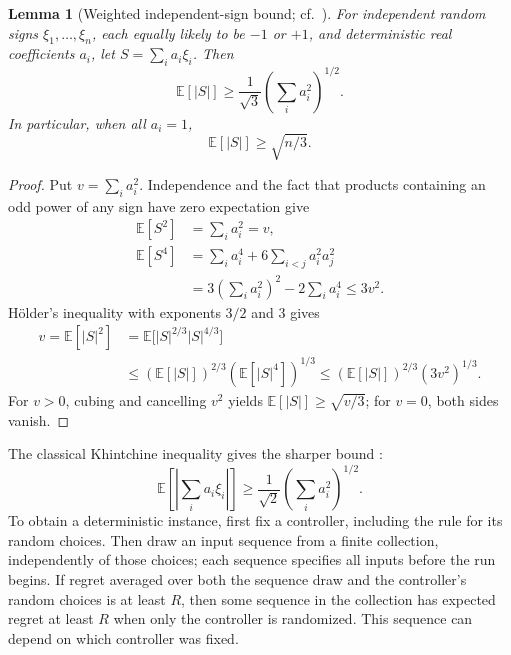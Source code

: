 \documentclass[11pt]{article}
\newcommand{\E}{\mathbb{E}}
\theoremstyle{plain}
\newtheorem{Thm:Lemma}[Thm:Theorem]{Lemma}
\theoremstyle{remark}
\numberwithin{equation}{section}
\begin{document}
\begin{Thm:Lemma}[Weighted independent-sign bound; cf.~{\cite{haagerup1981khintchine}}]
\label{lem:intro:signs}\label{ch6:lem:signs}
For independent random signs $\xi_1,\ldots,\xi_n$, each equally likely to be
$-1$ or $+1$, and deterministic real coefficients $a_i$, let
$S=\sum_i a_i\xi_i$. Then
\begin{equation}\label{eq:intro:sign-moment}
 \E[|S|]\ge\frac1{\sqrt3}\left(\sum_i a_i^2\right)^{1/2}.
\end{equation}
In particular, when all $a_i=1$,
\begin{equation}\label{ch6:eq:signs}
 \E[|S|]\ge\sqrt{n/3}.
\end{equation}
\end{Thm:Lemma}
\begin{proof}
Put $v=\sum_i a_i^2$.  Independence and the fact that products containing an
odd power of any sign have zero expectation give
\begin{align*}
 \E[S^2]&=\sum_i a_i^2=v,\\
 \E[S^4]
 &=\sum_i a_i^4+6\sum_{i<j}a_i^2a_j^2\\
 &=3\left(\sum_i a_i^2\right)^2-2\sum_i a_i^4
 \le3v^2.
\end{align*}
H\"older's inequality with exponents $3/2$ and $3$ gives
\begin{align*}
 v=\E[|S|^2]
 &=\E\bigl[|S|^{2/3}|S|^{4/3}\bigr]\\
 &\le(\E[|S|])^{2/3}(\E[|S|^4])^{1/3}
 \le(\E[|S|])^{2/3}(3v^2)^{1/3}.
\end{align*}
For $v>0$, cubing and cancelling $v^2$ yields
$\E[|S|]\ge\sqrt{v/3}$; for $v=0$, both sides vanish.
\end{proof}

The classical Khintchine inequality gives the sharper bound
\cite{haagerup1981khintchine}:
\begin{equation}\label{eq:intro:khintchine}
 \E\left[\left|\sum_i a_i\xi_i\right|\right]
 \ge\frac1{\sqrt2}\left(\sum_i a_i^2\right)^{1/2}.
\end{equation}
To obtain a deterministic instance, first fix a controller, including the
rule for its random choices. Then draw an input sequence from a finite
collection, independently of those choices; each sequence specifies all
inputs before the run begins. If regret averaged over both the sequence
draw and the controller's random choices is at least $R$, then some
sequence in the collection has expected regret at least $R$ when only
the controller is randomized. This sequence can depend on which
controller was fixed.



\end{document}
